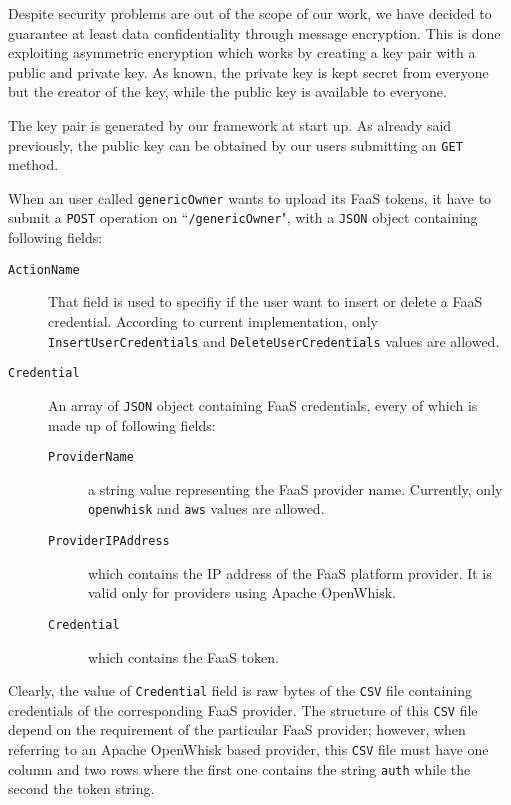 \documentclass[12pt,a4paper]{report}
\newcommand{\QuoteIntro}{``}
\begin{document}
Despite security problems are out of the scope of our work, we have decided to guarantee at least data confidentiality through message encryption. This is done exploiting asymmetric encryption which works by creating a key pair with a public and private key. As known, the private key is kept secret from everyone but the creator of the key, while the public key is available to everyone.

The key pair is generated by our framework at start up. As already said previously, the public key can be obtained by our users submitting an \texttt{GET} method.

When an user called \texttt{genericOwner} wants to upload its FaaS tokens, it have to submit a \texttt{POST} operation on \QuoteIntro\texttt{/genericOwner}", with a \texttt{JSON} object containing following fields:

\begin{description}
	\item[\texttt{ActionName}] That field is used to specifiy if the user want to insert or delete a FaaS credential. According to current implementation, only \texttt{InsertUserCredentials} and \texttt{DeleteUserCredentials} values are allowed.
	
	\item[\texttt{Credential}] An array of \texttt{JSON} object containing FaaS credentials, every of which is made up of following fields:
	
	\begin{description}
		\item[\texttt{ProviderName}] a string value representing the FaaS provider name. Currently, only \texttt{openwhisk} and \texttt{aws} values are allowed.
		
		\item[\texttt{ProviderIPAddress}] which contains the IP address of the FaaS platform provider. It is valid only for providers using Apache OpenWhisk.  
		
		\item[\texttt{Credential}] which contains the FaaS token. 
	\end{description}
\end{description}

Clearly, the value of \texttt{Credential} field is raw bytes of the \texttt{CSV} file containing credentials of the corresponding FaaS provider. The structure of this \texttt{CSV} file depend on the requirement of the particular FaaS provider; however, when referring to an Apache OpenWhisk based provider, this \texttt{CSV} file must have one column and two rows where the first one contains the string \texttt{auth} while the second the token string.
\end{document}
